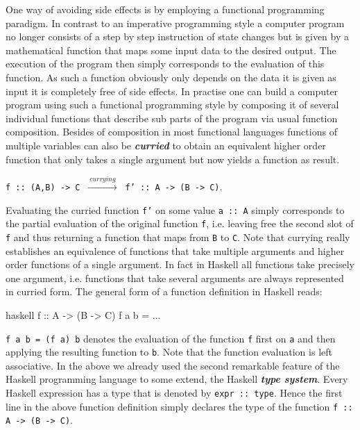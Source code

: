 \documentclass[a4paper,12pt, DIV=14, BCOR=5mm, twoside, headsepline, numbers=noenddot]{scrbook}
\begin{document}
One way of avoiding side effects is by employing a functional programming paradigm. In contrast to an imperative programming style a computer program no longer consists of a step by step instruction of state changes but is given by a mathematical function that maps some input data to the desired output. The execution of the program then simply corresponds to the evaluation of this function. As such a function obviously only depends on the data it is given as input it is completely free of side effects. In practise one can build a computer program using such a functional programming style by composing it of several individual functions that describe sub parts of the program via usual function composition. Besides of composition in most functional languages functions of multiple variables can also be  \textit{\textbf{curried}} to obtain an equivalent higher order function that only takes a single argument but now yields a function as result. 
\begin{center}
    \texttt{f :: (A,B) -> C} $\ \xrightarrow{ \ currying \ } \ $
    \texttt{f' :: A -> (B -> C)}.
\end{center}
Evaluating the curried function \texttt{f'} on some value \texttt{a :: A} simply corresponds to the partial evaluation of the original function \texttt{f}, i.e. leaving free the second slot of \texttt{f} and thus returning a function that maps from \texttt{B}  to \texttt{C}. Note that currying really establishes an equivalence of functions that take multiple arguments and higher order functions of a single argument.
In fact in Haskell all functions take precisely one argument, i.e. functions that take several arguments are always represented in curried form. The general form of a function definition in Haskell reads:
\begin{center}
\begin{cminted}{haskell}
f :: A -> (B -> C)
f a b = ...  
\end{cminted}
\end{center}
\texttt{f a b = (f a) b} denotes the evaluation of the function \texttt{f} first on \texttt{a} and then applying the resulting function to \texttt{b}. Note that the function evaluation is left associative.
In the above we already used the second remarkable feature of the  Haskell programming language to some extend, the Haskell \textbf{\textit{type system}}. Every Haskell expression has a type that is denoted by \texttt{expr :: type}. Hence the first line in the above function definition simply declares   the type of the function \texttt{f :: A -> (B -> C)}.
\end{document}
